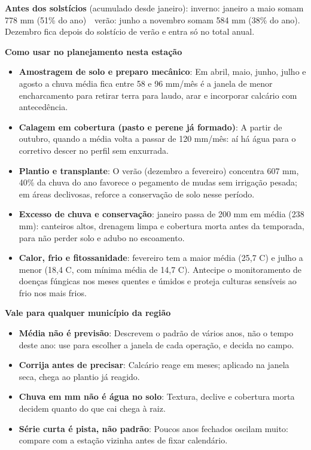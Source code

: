 \documentclass[10pt,a4paper]{article}
\begin{document}
\vspace{1pt}
{\footnotesize\textbf{Antes dos solstícios} (acumulado desde janeiro):
inverno: janeiro a maio somam 778 mm (51\% do ano) \,\textbullet\, verão: junho a novembro somam 584 mm (38\% do ano). Dezembro fica depois do solstício de verão e entra só no total
anual.}

\vspace{2pt}
{\bfseries\small Como usar no planejamento nesta estação}

\footnotesize\begin{itemize}\setlength{\itemsep}{0.5pt}
  \item \textbf{Amostragem de solo e preparo mecânico}: Em abril, maio, junho, julho e agosto a chuva média fica entre 58 e 96 mm/mês \textemdash{} é a janela de menor encharcamento para retirar terra para laudo, arar e incorporar calcário com antecedência.
  \item \textbf{Calagem em cobertura (pasto e perene já formado)}: A partir de outubro, quando a média volta a passar de 120 mm/mês: aí há água para o corretivo descer no perfil sem enxurrada.
  \item \textbf{Plantio e transplante}: O verão (dezembro a fevereiro) concentra 607 mm, 40\% da chuva do ano \textemdash{} favorece o pegamento de mudas sem irrigação pesada; em áreas declivosas, reforce a conservação de solo nesse período.
  \item \textbf{Excesso de chuva e conservação}: janeiro passa de 200 mm em média (238 mm): canteiros altos, drenagem limpa e cobertura morta antes da temporada, para não perder solo e adubo no escoamento.
  \item \textbf{Calor, frio e fitossanidade}: fevereiro tem a maior média (25,7 \textdegree{}C) e julho a menor (18,4 \textdegree{}C, com mínima média de 14,7 \textdegree{}C). Antecipe o monitoramento de doenças fúngicas nos meses quentes e úmidos e proteja culturas sensíveis ao frio nos mais frios.
\end{itemize}

\vspace{1pt}
{\bfseries\small Vale para qualquer município da região}

\scriptsize\begin{itemize}\setlength{\itemsep}{0.5pt}
  \item \textbf{Média não é previsão}: Descrevem o padrão de vários anos, não o tempo deste ano: use para escolher a janela de cada operação, e decida no campo.
  \item \textbf{Corrija antes de precisar}: Calcário reage em meses; aplicado na janela seca, chega ao plantio já reagido.
  \item \textbf{Chuva em mm não é água no solo}: Textura, declive e cobertura morta decidem quanto do que cai chega à raiz.
  \item \textbf{Série curta é pista, não padrão}: Poucos anos fechados oscilam muito: compare com a estação vizinha antes de fixar calendário.
\end{itemize}
\end{document}
